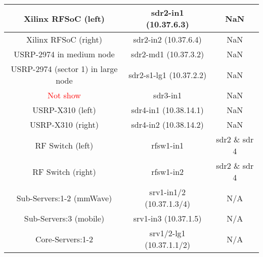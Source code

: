\documentclass{article}
\begin{document}
\begin{center}
\begin{tabular}{||c c c||}
            \hline
            Xilinx RFSoC (left) & sdr2-in1 (10.37.6.3) & NaN \\
            \hline
            Xilinx RFSoC (right) & sdr2-in2 (10.37.6.4) & NaN \\
            \hline
            USRP-2974 in medium node & sdr2-md1 (10.37.3.2) & NaN \\
            \hline
            USRP-2974 (sector 1) in large node & sdr2-s1-lg1 (10.37.2.2) & NaN \\
            \hline
            \textcolor{red}{Not show} & sdr3-in1 & NaN \\
            \hline
            USRP-X310 (left) & sdr4-in1 (10.38.14.1) & NaN \\ 
            \hline
            USRP-X310 (right) & sdr4-in2 (10.38.14.2) & NaN \\ 
            \hline
            RF Switch (left) & rfsw1-in1 & sdr2 \& sdr 4 \\
            \hline
            RF Switch (right) & rfsw1-in2 & sdr2 \& sdr 4 \\
            \hline
            Sub-Servers:1-2 (mmWave) & srv1-in1/2 (10.37.1.3/4) & N/A \\
            \hline
            Sub-Servers:3 (mobile) & srv1-in3 (10.37.1.5) & N/A \\
            \hline
            Core-Servers:1-2 & srv1/2-lg1 (10.37.1.1/2) & N/A \\ [1ex] 
            \hline
        \end{tabular}
    \end{center}
    
\end{document}
